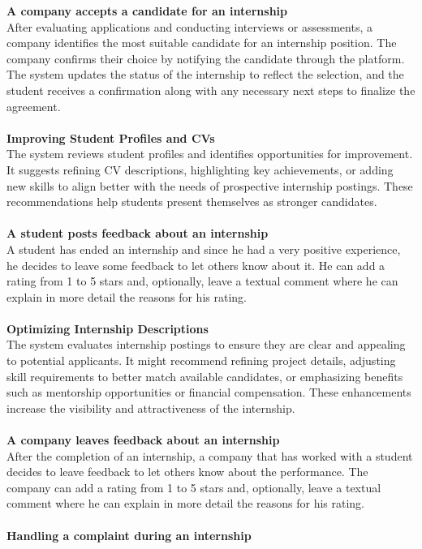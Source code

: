 \textbf{A company accepts a candidate for an internship}\\
After evaluating applications and conducting interviews or assessments, a company identifies the most suitable candidate for an internship position. The company confirms their choice by notifying the candidate through the platform. The system updates the status of the internship to reflect the selection, and the student receives a confirmation along with any necessary next steps to finalize the agreement.\\\\
\textbf{Improving Student Profiles and CVs}\\
The system reviews student profiles and identifies opportunities for improvement. It suggests refining CV descriptions, highlighting key achievements, or adding new skills to align better with the needs of prospective internship postings. These recommendations help students present themselves as stronger candidates.\\\\
\textbf{A student posts feedback about an internship}\\
A student has ended an internship and since he had a very positive experience, he decides to leave some feedback to let others know about it. He can add a rating from 1 to 5 stars and, optionally, leave a textual comment where he can explain in more detail the reasons for his rating.\\\\
\textbf{Optimizing Internship Descriptions}\\
The system evaluates internship postings to ensure they are clear and appealing to potential applicants. It might recommend refining project details, adjusting skill requirements to better match available candidates, or emphasizing benefits such as mentorship opportunities or financial compensation. These enhancements increase the visibility and attractiveness of the internship.\\\\
\textbf{A company leaves feedback about an internship}\\
After the completion of an internship, a company that has worked with a student decides to leave feedback  to let others know about the performance. The company can add a rating from 1 to 5 stars and, optionally, leave a textual comment where he can explain in more detail the reasons for his rating.\\\\
\textbf{Handling a complaint during an internship}\\
